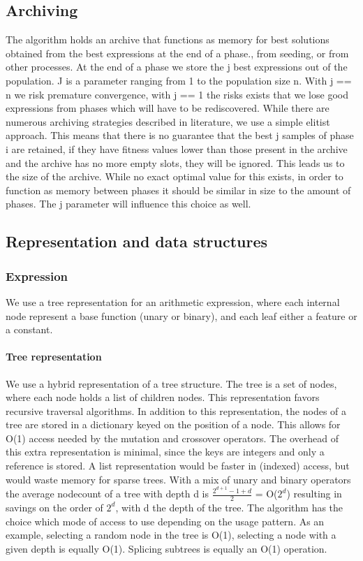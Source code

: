\subsection{Archiving}
The algorithm holds an archive that functions as memory for best solutions obtained from the best expressions at the end of a phase., from seeding, or from other processes. 
At the end of a phase we store the j best expressions out of the population. J is a parameter ranging from 1 to the population size n. With j == n we risk premature convergence, with j == 1 the risks exists that we lose good expressions from phases which will have to be rediscovered. 
While there are numerous archiving strategies described in literature, we use a simple elitist approach. This means that there is no guarantee that the best j samples of phase i are retained, if they have fitness values lower than those present in the archive and the archive has no more empty slots, they will be ignored.
This leads us to the size of the archive. While no exact optimal value for this exists, in order to function as memory between phases it should be similar in size to the amount of phases. The j parameter will influence this choice as well.

\subsection{Representation and data structures}\label{subsectree}
\subsubsection{Expression}
We use a tree representation for an arithmetic expression, where each internal node represent a base function (unary or binary), and each leaf either a feature or a constant.

\paragraph{Tree representation}
We use a hybrid representation of a tree structure. The tree is a set of nodes, where each node holds a list of children nodes. This representation favors recursive traversal algorithms. In addition to this representation, the nodes of a tree are stored in a dictionary keyed on the position of a node. This allows for O(1) access needed by the mutation and crossover operators. The overhead of this extra representation is minimal, since the keys are integers and only a reference is stored. A list representation would be faster in (indexed) access, but would waste memory for sparse trees. With a mix of unary and binary operators the average nodecount of a tree with depth d is $\frac{2^{d+1}-1  + d}{2}$ = O($2^d$) resulting in savings on the order of $2^d$, with d the depth of the tree.
The algorithm has the choice which mode of access to use depending on the usage pattern. As an example, selecting a random node in the tree is O(1), selecting a node with a given depth is equally O(1). Splicing subtrees is equally an O(1) operation.

